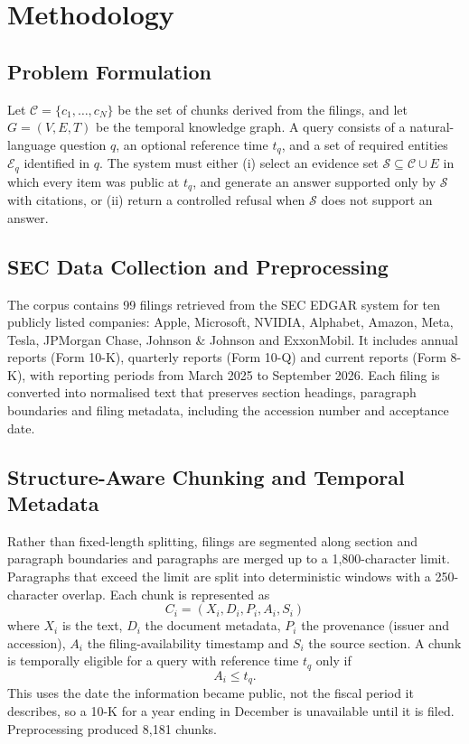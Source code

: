 \documentclass[conference]{IEEEtran}
\begin{document}
\section{Methodology}
\subsection{Problem Formulation}
Let $\mathcal{C}=\{c_1,\dots,c_N\}$ be the set of chunks derived from the filings, and let $G=(V,E,T)$ be the temporal knowledge graph. A query consists of a natural-language question $q$, an optional reference time $t_q$, and a set of required entities $\mathcal{E}_q$ identified in $q$. The system must either (i) select an evidence set $\mathcal{S}\subseteq\mathcal{C}\cup E$ in which every item was public at $t_q$, and generate an answer supported only by $\mathcal{S}$ with citations, or (ii) return a controlled refusal when $\mathcal{S}$ does not support an answer.

\subsection{SEC Data Collection and Preprocessing}
The corpus contains 99 filings retrieved from the SEC EDGAR system for ten publicly listed companies: Apple, Microsoft, NVIDIA, Alphabet, Amazon, Meta, Tesla, JPMorgan Chase, Johnson \& Johnson and ExxonMobil. It includes annual reports (Form 10-K), quarterly reports (Form 10-Q) and current reports (Form 8-K), with reporting periods from March 2025 to September 2026. Each filing is converted into normalised text that preserves section headings, paragraph boundaries and filing metadata, including the accession number and acceptance date.

\subsection{Structure-Aware Chunking and Temporal Metadata}
Rather than fixed-length splitting, filings are segmented along section and paragraph boundaries and paragraphs are merged up to a 1,800-character limit. Paragraphs that exceed the limit are split into deterministic windows with a 250-character overlap. Each chunk is represented as
\begin{equation}
C_i = (X_i, D_i, P_i, A_i, S_i)
\end{equation}
where $X_i$ is the text, $D_i$ the document metadata, $P_i$ the provenance (issuer and accession), $A_i$ the filing-availability timestamp and $S_i$ the source section. A chunk is temporally eligible for a query with reference time $t_q$ only if
\begin{equation}
A_i \le t_q .
\label{eq:elig}
\end{equation}
This uses the date the information became public, not the fiscal period it describes, so a 10-K for a year ending in December is unavailable until it is filed. Preprocessing produced 8,181 chunks.
\end{document}
